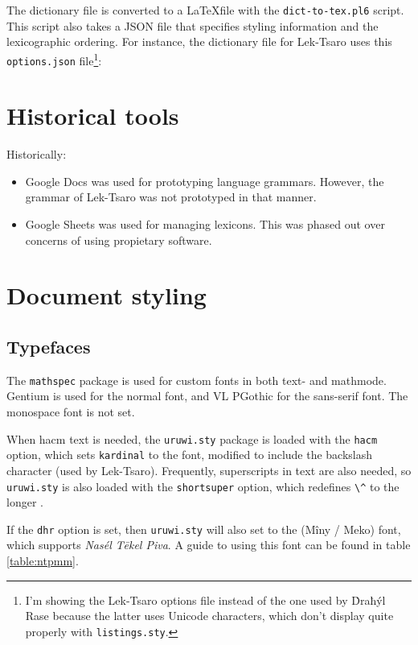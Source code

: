 \documentclass{book}
\begin{document}
The dictionary file is converted to a \LaTeX file with the \texttt{dict-to-tex.pl6} script. This script also takes a JSON file that specifies styling information and the lexicographic ordering. For instance, the dictionary file for Lek-Tsaro uses this \texttt{options.json} file\footnote{I'm showing the Lek-Tsaro options file instead of the one used by Ḋraħýl Rase because the latter uses Unicode characters, which don't display quite properly with \texttt{listings.sty}.}:



\section{Historical tools}

Historically:

\begin{itemize}
  \item Google Docs was used for prototyping language grammars. However, the grammar of Lek-Tsaro was not prototyped in that manner.
  \item Google Sheets was used for managing lexicons. This was phased out over concerns of using propietary software.
\end{itemize}

\section{Document styling}

\subsection{Typefaces}

The \texttt{mathspec} package is used for custom fonts in both text- and mathmode. Gentium is used for the normal font, and \textsf{VL PGothic} for the sans-serif font. The monospace font is not set.

When hacm text is needed, the \texttt{uruwi.sty} package is loaded with the \texttt{hacm} option, which sets \texttt{\bs{}kardinal} to the  font, modified to include the backslash character (used by Lek-Tsaro). Frequently, superscripts in text are also needed, so \texttt{uruwi.sty} is also loaded with the \texttt{shortsuper} option, which redefines \verb|\^| to the longer \texttt{}.

If the \texttt{dhr} option is set, then \texttt{uruwi.sty} will also set \texttt{} to the  (Mîny / Meko) font, which supports \emph{Nasél Tēkel Piva}. A guide to using this font can be found in table \ref{table:ntpmm}.
\end{document}
